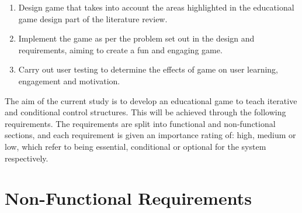 \documentclass[a4paper,11.5pt]{report}
\numberwithin{figure}{section}
\numberwithin{table}{section}
\numberwithin{equation}{section}
\numberwithin{equation}{section}
\begin{document}
\begin{enumerate}
	\item Design game that takes into account the areas highlighted in the educational game design part of the literature review.
	\item Implement the game as per the problem set out in the design and requirements, aiming to create a fun and engaging game.
	\item Carry out user testing to determine the effects of game on user learning, engagement and motivation.
\end{enumerate}



The aim of the current study is to develop an educational game to teach iterative and conditional control structures. This will be achieved through the following requirements. The requirements are split into functional and non-functional sections, and each requirement is given an importance rating of: high, medium or low, which refer to being essential, conditional or optional for the system respectively. 









\section{Non-Functional Requirements}
\end{document}
